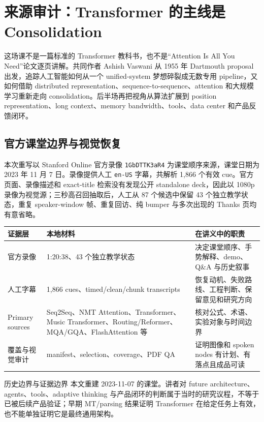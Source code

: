 \section{来源审计：Transformer 的主线是 Consolidation}

这场课不是一篇标准的 Transformer 教科书，也不是“Attention Is All You Need”论文逐页讲解。共同作者 Ashish Vaswani 从 1955 年 Dartmouth proposal 出发，追踪人工智能如何从一个 unified-system 梦想碎裂成无数专用 pipeline，又如何借助 distributed representation、sequence-to-sequence、attention 和大规模学习重新走向 consolidation。后半场再把视角从算法扩展到 position representation、long context、memory bandwidth、tools、data center 和产品反馈闭环。

\subsection{官方课堂边界与视觉恢复}

本次重写以 Stanford Online 官方录像 \texttt{1GbDTTK3aR4} 为课堂顺序来源，课堂日期为 2023 年 11 月 7 日。录像提供人工 \texttt{en-US} 字幕，共解析 1,866 个有效 cue。官方页面、录像描述和 exact-title 检索没有发现公开 standalone deck，因此以 1080p 录像为视觉源；三秒高召回抽取后，人工从 87 个候选中保留 43 个独立教学状态，重复 speaker-window 帧、重复回访、纯 bumper 与多次出现的 Thanks 页均有意省略。

\begin{longtable}{@{}L{0.18\textwidth}L{0.31\textwidth}L{0.40\textwidth}@{}}
\toprule
证据层 & 本地材料 & 在讲义中的职责 \\
\midrule
官方录像 & 1:20:38、43 个独立教学状态 & 决定课堂顺序、手势解释、demo、Q\&A 与历史叙事 \\
人工字幕 & 1,866 cues、timed/clean/chunk transcripts & 恢复动机、失败路线、工程判断、保留意见和研究方向 \\
Primary sources & Seq2Seq、NMT Attention、Transformer、Music Transformer、Routing/Reformer、MQA/GQA、FlashAttention 等 & 核对公式、术语、实验对象与时间边界 \\
覆盖与视觉审计 & manifest、selection、coverage、PDF QA & 证明图像和 spoken nodes 有计划、有落点且成品可读 \\
\bottomrule
\end{longtable}

\begin{warningbox}{历史边界与证据边界}
本文重建 2023-11-07 的课堂。讲者对 future architecture、agents、tools、adaptive thinking 与产品闭环的判断属于当时的研究议程，不等于已被后续产品验证；早期 MT/parsing 结果证明 Transformer 在给定任务上有效，也不能单独证明它是最终通用架构。
\end{warningbox}

